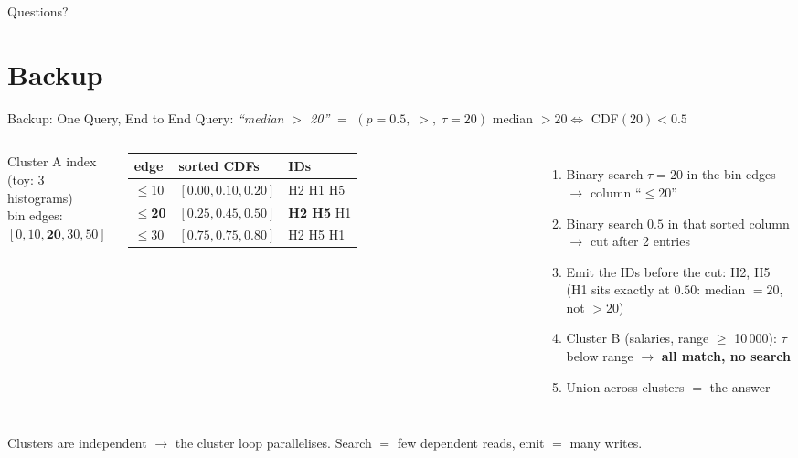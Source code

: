 \documentclass[aspectratio=169,10pt]{beamer}
\newcommand{\good}[1]{\textcolor{green!50!black}{#1}}
\begin{document}
\begin{frame}[standout]
  Questions?
\end{frame}

\appendix
\section{Backup}

\begin{frame}{Backup: One Query, End to End}
  Query: \emph{``median $>$ 20''} $=$ $(p{=}0.5,\; >,\; \tau{=}20)$
  \hfill \alert{median $> 20 \iff$ CDF$(20) < 0.5$}
  \vspace{1ex}
  \begin{columns}[T]
    \centering
    Cluster A index (toy: 3 histograms)\\[0.5ex]
    \footnotesize
    bin edges: $[0, 10, \mathbf{20}, 30, 50]$\\[1ex]
    \begin{tabular}{lll}
      \toprule
      edge & sorted CDFs & IDs \\
      \midrule
      $\leq$10 & $[0.00, 0.10, 0.20]$ & H2 H1 H5 \\
      $\boldsymbol{\leq}$\textbf{20} & $[\mathbf{0.25}, \mathbf{0.45}, 0.50]$ & \textbf{H2 H5} H1 \\
      $\leq$30 & $[0.75, 0.75, 0.80]$ & H2 H5 H1 \\
      \bottomrule
    \end{tabular}
    \begin{enumerate}
      \item Binary search $\tau{=}20$ in the bin edges $\to$ column ``$\leq$20''
      \item Binary search $0.5$ in that sorted column $\to$ cut after 2 entries
      \item Emit the IDs before the cut: \good{H2, H5} \\ {\footnotesize(H1 sits exactly at $0.50$: median $= 20$, not $> 20$)}
      \item Cluster B (salaries, range $\geq$ 10\,000): $\tau$ below range $\to$ \textbf{all match, no search}
      \item Union across clusters $=$ the answer
    \end{enumerate}
  \end{columns}
  \vfill
  Clusters are independent $\to$ the cluster loop parallelises. Search $=$ few dependent reads, emit $=$ many writes.
\end{frame}
\end{document}
